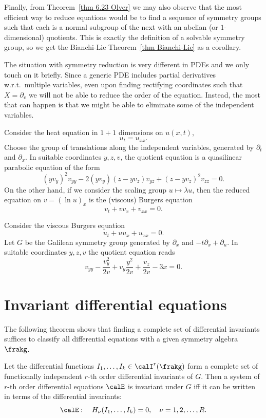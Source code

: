 Finally, from Theorem~\ref{thm 6.23 Olver} we may also observe that the most efficient way to reduce equations would be to find a sequence of symmetry groups such that each is a normal subgroup of the next with an abelian (or $1$-dimensional) quotients. This is exactly the definition of a solvable symmetry group, so we get the Bianchi-Lie Theorem~\ref{thm Bianchi-Lie} as a corollary.


The situation with symmetry reduction is very different in PDEs and we only touch on it briefly. Since a generic PDE includes partial derivatives w.r.t.\ multiple variables, even upon finding rectifying coordinates such that $X=\partial_v$ we will not be able to reduce the order of the equation. Instead, the most that can happen is that we might be able to eliminate some of the independent variables. 

\begin{example}
    Consider the heat equation in $1+1$ dimensions on $u(x,t)$,
    \[u_t=u_{xx}.\]
    Choose the group of translations along the independent variables, generated by $\partial_t$ and $\partial_x$. In suitable coordinates $y,z,v$, the quotient equation is a quasilinear parabolic equation of the form 
    \[(yv_y)^2v_{yy}-2(yv_y)(z-yv_z)v_{yz}+(z-yv_z)^2v_{zz}=0.\]
    On the other hand, if we consider the scaling group $u\mapsto \lambda u$, then the reduced equation on $v=(\ln u)_x$ is the (viscous) Burgers equation
    \[v_t+vv_x+v_{xx}=0.\]
\end{example}
\begin{example}
    Consider the viscous Burgers equation 
    \[u_t+uu_x+u_{xx}=0.\]
    Let $G$ be the Galilean symmetry group generated by $\partial_x$ and $-t\partial_x+\partial_u$. In suitable coordinates $y,z,v$ the quotient equation reads 
    \[v_{yy}-\frac{v_y^2}{2v}+v_y\frac{y^2}{2v}+\frac{v_z}{2v}-3x=0.\]
\end{example}







\section{Invariant differential equations}

The following theorem shows that finding a complete set of differential invariants suffices to classify all differential equations with a given symmetry algebra $\frakg$.

\begin{thm}
    Let the differential functions $I_1,\ldots,I_k\in\calI^r(\frakg)$ form a complete set of functionally independent $r$-th order differential invariants of $G$. Then a system of $r$-th order differential equations $\calE$ is invariant under $G$ iff it can be written in terms of the differential invariants:
    \[\calE:\quad H_\nu(I_1,\ldots,I_k)=0,\quad \nu=1,2,\ldots,R.\]
\end{thm}



